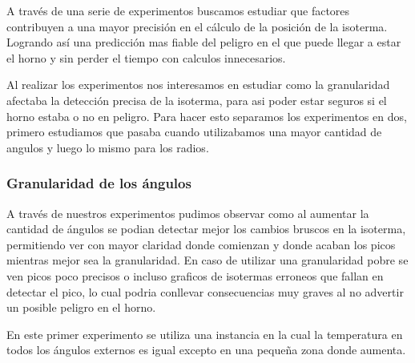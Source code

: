 A través de una serie de experimentos buscamos estudiar que factores contribuyen a una mayor precisión en el cálculo de la posición de la isoterma. Logrando así una predicción mas fiable del peligro en el que puede llegar a estar el horno y sin perder el tiempo con calculos innecesarios.


Al realizar los experimentos nos interesamos en estudiar como la granularidad afectaba la detección precisa de la isoterma, para asi poder estar seguros si el horno estaba o no en peligro. Para hacer esto separamos los experimentos en dos, primero estudiamos que pasaba cuando utilizabamos una mayor cantidad de angulos y luego lo mismo para los radios.

\subsubsection{Granularidad de los ángulos}

A través de nuestros experimentos pudimos observar como al aumentar la cantidad de ángulos se podian detectar mejor los cambios bruscos en la isoterma, permitiendo ver con mayor claridad donde comienzan y donde acaban los picos mientras mejor sea la granularidad. En caso de utilizar una granularidad pobre se ven picos poco precisos o incluso graficos de isotermas erroneos que fallan en detectar el pico, lo cual podria conllevar consecuencias muy graves al no advertir un posible peligro en el horno.

En este primer experimento se utiliza una instancia en la cual la temperatura en todos los ángulos externos es igual excepto en una pequeña zona donde aumenta.

